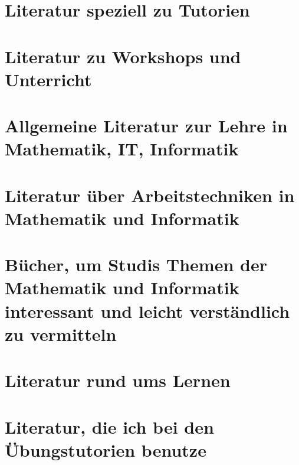 \documentclass[a4paper,openany,twoside,titlepage,10pt,headsepline]{scrbook}
\begin{document}
\section{Literatur speziell zu Tutorien}
\cite{tutorenschulung-kassel, fackel-oder-funzel, torch-or-firehose-eggert, torch-or-firehose, tutor-leitfaden}

\section{Literatur zu Workshops und Unterricht}
\cite{moderationstechniken, visualisieren-praesentieren-moderieren, workshop-buch, treibhaeuser-der-zukunft}

\section{Allgemeine Literatur zur Lehre in Mathematik, IT, Informatik}
\cite{teaching-engineering, red-pen, it-trainer}

\section{Literatur über Arbeitstechniken in Mathematik und Informatik}
\cite{obda, schule-des-denkens, solve-it, prove-it}

\section{Bücher, um Studis Themen der Mathematik und Informatik interessant und leicht verständlich zu vermitteln}
\cite{mathe-humor, ideen-der-informatik, mathe-westentasche, in-mathe-war-ich-immer-schlecht}

\section{Literatur rund ums Lernen}
\cite{denken-lernen-vergessen, lernen-zu-lernen}

\section{Literatur, die ich bei den Übungstutorien benutze}
\cite{algorithms}




\end{document}

